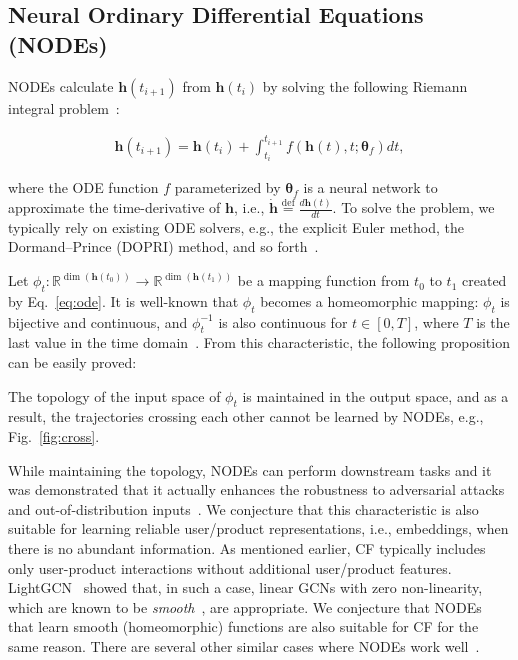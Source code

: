 \documentclass[sigconf]{acmart}
\begin{document}
\subsection{Neural Ordinary Differential Equations (NODEs)} NODEs calculate $\bm{h}(t_{i+1})$ from $\bm{h}(t_i)$ by solving the following Riemann integral problem~\cite{NIPS2018_7892}:
\begin{linenomath*}\begin{align}\label{eq:ode}
    \bm{h}(t_{i+1}) = \bm{h}(t_i) + \int_{t_i}^{t_{i+1}}f(\bm{h}(t),t;\bm{\theta}_f)dt,
\end{align}\end{linenomath*}where the ODE function $f$ parameterized by $\bm{\theta}_f$ is a neural network to approximate the time-derivative of $\bm{h}$, i.e., $\dot{\bm{h}} \stackrel{\text{def}}{=} \frac{d \bm{h}(t)}{d t}$. To solve the problem, we typically rely on existing ODE solvers, e.g., the explicit Euler method, the Dormand--Prince (DOPRI) method, and so forth~\cite{DORMAND198019}.

Let $\phi_t : \mathbb{R}^{\dim(\bm{h}(t_0))} \rightarrow \mathbb{R}^{\dim(\bm{h}(t_1))}$ be a mapping function from $t_0$ to $t_1$ created by Eq.~\eqref{eq:ode}. It is well-known that $\phi_t$ becomes a homeomorphic mapping: $\phi_t$ is bijective and continuous, and $\phi_t^{-1}$ is also continuous for $t \in [0,T]$, where $T$ is the last value in the time domain~\cite{NIPS2019_8577,massaroli2020dissecting}. From this characteristic, the following proposition can be easily proved:
\begin{proposition}\label{p:hom}
The topology of the input space of $\phi_t$ is maintained in the output space, and as a result, the trajectories crossing each other cannot be learned by NODEs, e.g., Fig.~\ref{fig:cross}.
\end{proposition}

 While maintaining the topology, NODEs can perform downstream tasks and it was demonstrated that it actually enhances the robustness to adversarial attacks and out-of-distribution inputs~\cite{yan2020robustness}. We conjecture that this characteristic is also suitable for learning reliable user/product representations, i.e., embeddings, when there is no abundant information. As mentioned earlier, CF typically includes only user-product interactions without additional user/product features. LightGCN~\cite{10.1145/3397271.3401063} showed that, in such a case, linear GCNs with zero non-linearity, which are known to be \emph{smooth}~\cite{Chen_Lin_Li_Li_Zhou_Sun_2020}, are appropriate. We conjecture that NODEs that learn smooth (homeomorphic) functions are also suitable for CF for the same reason. There are several other similar cases where NODEs work well~\cite{kim2021oct,jhin2021acenode,lightmove}.
\end{document}
